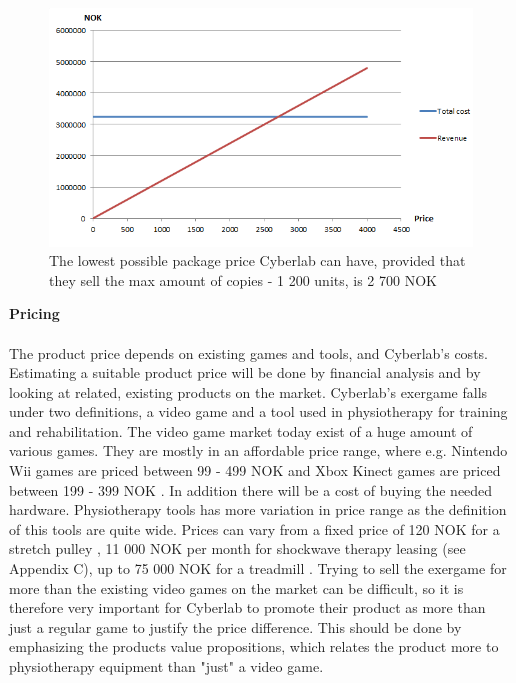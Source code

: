 \begin{figure}
\begin{center}
\includegraphics[scale=0.8]{revenuestreamprice}
\caption[Price example]{The lowest possible package price Cyberlab can have, provided that they sell the max amount of  copies - 1 200 units, is 2 700 NOK}
\label{fig:RevenueStreamPrice}
\end{center}
\end{figure}
\textbf{Pricing}\\ \\
The product price depends on existing games and tools, and Cyberlab's costs. Estimating a suitable product price will be done by financial analysis and by looking at related, existing products on the market. Cyberlab's exergame falls under two definitions, a video game and a tool used in physiotherapy for training and rehabilitation. The video game market today exist of a huge amount of various games. They are mostly in an affordable price range, where e.g. Nintendo Wii games are priced between 99 - 499 NOK \cite{elkjopwii} and Xbox Kinect games are priced between 199 - 399 NOK \cite{elkjopkinect}. In addition there will be a cost of buying the needed hardware. Physiotherapy tools has more variation in price range as the definition of this tools are quite wide. Prices can vary from a fixed price of 120 NOK for a stretch pulley \cite{stretchpulley}, 11 000 NOK per month for shockwave therapy leasing (see Appendix C), up to 75 000 NOK for a treadmill \cite{treadmill}. Trying to sell the exergame for more than the existing video games on the market can be difficult, so it is therefore very important for Cyberlab to promote their product as more than just a regular game to justify the price difference. This should be done by emphasizing the products value propositions, which relates the product more to physiotherapy equipment than "just" a video game. \\ \\
